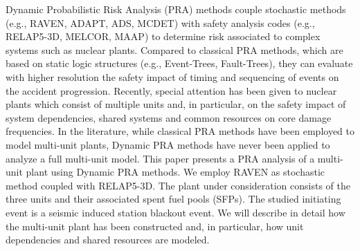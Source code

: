 Dynamic Probabilistic Risk Analysis (PRA) methods couple stochastic methods 
(e.g., RAVEN, ADAPT, ADS, MCDET) with safety analysis codes (e.g., RELAP5-3D, 
MELCOR, MAAP) to determine risk associated to complex systems such as nuclear 
plants. Compared to classical PRA methods, which are based on static logic 
structures (e.g., Event-Trees, Fault-Trees), they can evaluate with higher 
resolution the safety impact of timing and sequencing of events on the 
accident progression. Recently, special attention has been given to nuclear 
plants which consist of multiple units and, in particular, on the safety 
impact of system dependencies, shared systems and common resources on core 
damage frequencies. In the literature, while classical PRA methods have been 
employed to model multi-unit plants, Dynamic PRA methods have never been applied 
to analyze a full multi-unit model. This paper presents a PRA analysis of a 
multi-unit plant using Dynamic PRA methods. We employ RAVEN as stochastic 
method coupled with RELAP5-3D. The plant under consideration consists of the 
three units and their associated spent fuel pools (SFPs). The studied initiating
event is a seismic induced station blackout event. We will describe in detail 
how the multi-unit plant has been constructed and, in particular, how unit 
dependencies and shared resources are modeled.
